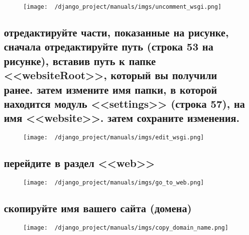 \documentclass[12pt]{article}
\begin{document}
	\begin{figure}[H]
		\centering
		\texttt{[image: ~/django\_project/manuals/imgs/uncomment\_wsgi.png]}
		\caption{}
	\end{figure}

  \subsection{отредактируйте части, показанные на рисунке, сначала отредактируйте путь (строка 53 на рисунке), вставив путь к папке <<websiteRoot>>, который вы получили ранее. затем измените имя папки, в которой находится модуль <<settings>> (строка 57), на имя <<website>>. затем сохраните изменения.}

	\begin{figure}[H]
		\centering
		\texttt{[image: ~/django\_project/manuals/imgs/edit\_wsgi.png]}
		\caption{}
	\end{figure}

  \subsection{перейдите в раздел <<web>>}

	\begin{figure}[H]
		\centering
		\texttt{[image: ~/django\_project/manuals/imgs/go\_to\_web.png]}
		\caption{}
	\end{figure}

  \subsection{скопируйте имя вашего сайта (домена)}
	\begin{figure}[H]
		\centering
		\texttt{[image: ~/django\_project/manuals/imgs/copy\_domain\_name.png]}
		\caption{}
	\end{figure}
\end{document}
